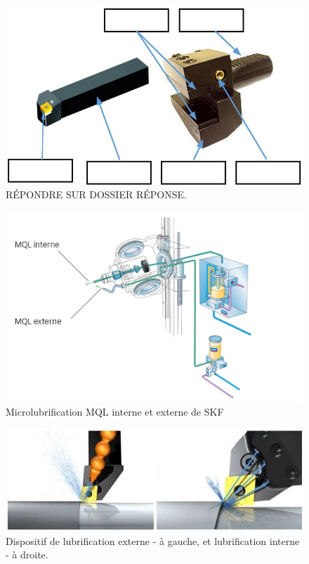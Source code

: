 \documentclass[12pt]{article}
\begin{document}
\begin{figure}
\centering
\includegraphics[width=0.8\linewidth]{Images/PP1.JPG}
\caption{RÉPONDRE SUR DOSSIER RÉPONSE.}
\label{PP1}
\end{figure}


\begin{figure}
\centering
\includegraphics[width=0.9\linewidth]{Images/M1.jpg}
\caption{Microlubrification MQL interne et externe de SKF}
\label{M1}
\end{figure}



\begin{figure}
\centering
\includegraphics[width=0.9\linewidth]{Images/L13.jpg}
\caption{Dispositif de lubrification externe - à gauche, et lubrification interne - à droite.}
\label{L13}
\end{figure}
\end{document}
